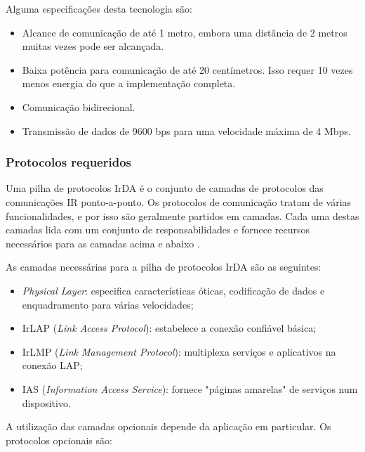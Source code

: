 \documentclass[conference]{IEEEtran}
\begin{document}
Alguma especificações desta tecnologia são:

\begin{itemize}

 \item Alcance de comunicação de até 1 metro, embora uma distância de 2 metros muitas vezes pode ser alcançada.
 \item Baixa potência para comunicação de até 20 centímetros. Isso requer 10 vezes menos energia do que a implementação completa.
 \item Comunicação bidirecional.
 \item Transmissão de dados de 9600 bps para uma velocidade máxima de 4 Mbps.

\end{itemize}

\subsubsection{Protocolos requeridos}

Uma pilha de protocolos IrDA é o conjunto de camadas de protocolos das comunicações IR ponto-a-ponto. 
Os protocolos de comunicação tratam de várias funcionalidades, e por isso são geralmente partidos em camadas. 
Cada uma destas camadas lida com um conjunto de responsabilidades e fornece recursos necessários para as camadas acima e abaixo \cite{megowan1996irda}.

As camadas necessárias para a pilha de protocolos IrDA são as seguintes:

\begin{itemize}

 \item \textit{Physical Layer}: especifica características óticas, codificação de dados e enquadramento para várias velocidades;
 \item IrLAP (\textit{Link Access Protocol}): estabelece a conexão confiável básica;
 \item IrLMP (\textit{Link Management Protocol}): multiplexa serviços e aplicativos na conexão LAP;
 \item IAS (\textit{Information Access Service}): fornece "páginas amarelas" de serviços num dispositivo.

\end{itemize}

A utilização das camadas opcionais depende da aplicação em particular. Os protocolos opcionais são:
\end{document}
